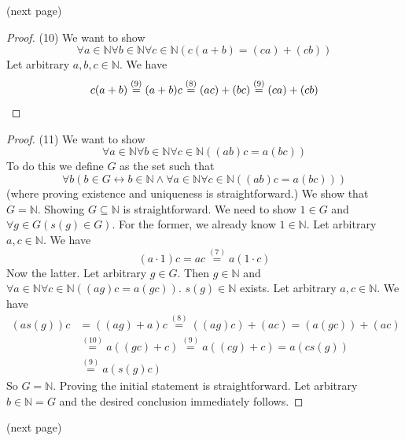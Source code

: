 \documentclass{report}
\begin{document}
\noindent(next page)\newpage
\begin{proof}(10)
We want to show
\begin{equation*}
\forall a\in\mathbb N\forall b\in\mathbb N\forall c\in\mathbb N(c(a+b)=(ca)+(cb))
\end{equation*}
Let arbitrary $a,b,c\in\mathbb N$. We have
\begin{equation*}
c(a+b)\overset{(9)}{=}(a+b)c\overset{(8)}{=}(ac)+(bc)\overset{(9)}{=}(ca)+(cb)\qedhere
\end{equation*}
\end{proof}
\begin{proof}(11)
We want to show
\begin{equation*}
\forall a\in\mathbb N\forall b\in\mathbb N\forall c\in\mathbb N((ab)c=a(bc))
\end{equation*}
To do this we define $G$ as the set such that
\begin{equation*}
\forall b(b\in G\leftrightarrow b\in\mathbb N\land\forall a\in\mathbb N\forall c\in\mathbb N((ab)c=a(bc)))
\end{equation*}
(where proving existence and uniqueness is straightforward.) We show that $G=\mathbb N$.
Showing $G\subseteq\mathbb N$ is straightforward. We need to show $1\in G$ and $\forall g\in G(s(g)\in G)$. For the former, we already know $1\in\mathbb N$. Let arbitrary $a,c\in\mathbb N$. We have
\begin{equation*}
(a\cdot1)c=ac\overset{(7)}{=}a(1\cdot c)
\end{equation*}
\indent Now the latter. Let arbitrary $g\in G$. Then $g\in\mathbb N$ and $\forall a\in\mathbb N\forall c\in\mathbb N((ag)c=a(gc))$. $s(g)\in\mathbb N$ exists. Let arbitrary $a,c\in\mathbb N$.
We have
\begin{align*}
(as(g))c&=((ag)+a)c\overset{(8)}{=}((ag)c)+(ac)=(a(gc))+(ac)\\
&\overset{(10)}{=}a((gc)+c)\overset{(9)}{=}a((cg)+c)=a(cs(g))\\
&\overset{(9)}{=}a(s(g)c)
\end{align*}
So $G=\mathbb N$. Proving the initial statement is straightforward. Let arbitrary $b\in\mathbb N=G$
and the desired conclusion immediately follows.
\end{proof}
\noindent(next page)\newpage
\end{document}
